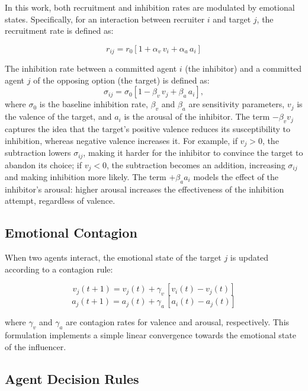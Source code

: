 \documentclass[a4paper,twoside]{article}
\begin{document}
In this work, both recruitment and inhibition rates are modulated by emotional states. Specifically, for an interaction between recruiter $i$ and target $j$, the recruitment rate is defined as:

\begin{equation}
r_{ij} = r_0 \left[ 1 + \alpha_v \, v_i + \alpha_a \, a_i \right]
\end{equation}

The inhibition rate between a committed agent $i$ (the inhibitor) and a committed agent $j$ of the opposing option (the target) is defined as:
\begin{equation}
\sigma_{ij} = \sigma_0 \left[ 1 - \beta_v \, v_j + \beta_a \, a_i \right],
\end{equation}
where $\sigma_0$ is the baseline inhibition rate, $\beta_v$ and $\beta_a$ are sensitivity parameters, $v_j$ is the valence of the target, and $a_i$ is the arousal of the inhibitor. 
The term $-\beta_v v_j$ captures the idea that the target's positive valence reduces its susceptibility to inhibition, whereas negative valence increases it. 
For example, if $v_j > 0$, the subtraction lowers $\sigma_{ij}$, making it harder for the inhibitor to convince the target to abandon its choice; if $v_j < 0$, the subtraction becomes an addition, increasing $\sigma_{ij}$ and making inhibition more likely. 
The term $+\beta_a a_i$ models the effect of the inhibitor's arousal: higher arousal increases the effectiveness of the inhibition attempt, regardless of valence.


\subsection{Emotional Contagion}

When two agents interact, the emotional state of the target $j$ is updated according to a contagion rule:

\begin{equation}
v_j(t+1) = v_j(t) + \gamma_v \, \left[ v_i(t) - v_j(t) \right]
\end{equation}
\begin{equation}
a_j(t+1) = a_j(t) + \gamma_a \, \left[ a_i(t) - a_j(t) \right]
\end{equation}

where $\gamma_v$ and $\gamma_a$ are contagion rates for valence and arousal, respectively. This formulation implements a simple linear convergence towards the emotional state of the influencer.

\subsection{Agent Decision Rules}
\end{document}

